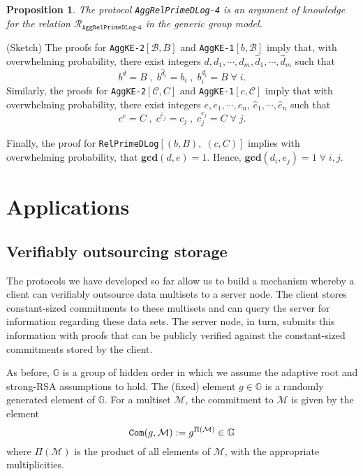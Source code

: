 \documentclass[11pt, lettersize, notitlepage, leqno, footskip=0.6cm]{article}
\newcommand{\ttt}{\texttt}
\newcommand{\mc}{\mathcal}
\newcommand{\mb}{\mathbb}
\newcommand{\mbf}{\mathbf}
\newcommand{\what}{\widehat}
\newcommand{\vs}{\vspace{-0.15cm}}
\newcommand{\op}{overwhelming probability}
\newcommand{\GCD}{\mbf{gcd}}
\newtheorem{Prop}[Thm]{Proposition}
\numberwithin{equation}{section}
\begin{document}
\begin{Prop} The protocol \verb|AggRelPrimeDLog-4| is an argument of knowledge for the relation $\mc{R}_{\ttt{AggRelPrimeDLog-4}}$ in the generic group model.\end{Prop}

\begin{prf} (Sketch) The proofs for \verb|AggKE-2|$[\mc{B}, B]$ and \verb|AggKE-1|$[b,\mc{B}]$ imply that, with overwhelming probability, there exist integers $d,d_1,\cdots,d_m,\what{d}_1,\cdots,\what{d}_m$ such that \vs $$b^d = B\;,\; b^{\what{d}_i}= b_i\;,\; b_i^{d_i}= B\;\forall\; i.$$ Similarly, the proofs for \verb|AggKE-2|$[\mc{C}, C]$ and \verb|AggKE-1|$[c,\mc{C}]$ imply that with overwhelming probability, there exist integers $e,e_1,\cdots,e_n$, $\what{e}_1,\cdots,\what{e}_n$ such that \vs $$c^e = C\;,\; c^{\what{e}_j}= c_j\;,\;c_j^{e_j}= C\;\forall\; j.$$ 

Finally, the proof for \verb|RelPrimeDLog|$[(b,B),\;(c,C)]$ implies with \op, that $\GCD(d,e) = 1$. Hence, $\GCD(d_i,e_j) = 1\;\forall\;i,j$.

\end{prf}

\bigskip

\section{\fontsize{12}{12} Applications}

\subsection{\fontsize{11}{11} Verifiably outsourcing storage}

The protocols we have developed so far allow us to build a mechanism whereby a client can verifiably outsource data multisets to a server node. The client stores constant-sized commitments to these multisets and can query the server for information regarding these data sets. The server node, in turn, submits this information with proofs that can  be publicly verified against the constant-sized commitments stored by the client.

As before, $\mb{G}$ is a group of hidden order in which we assume the adaptive root and strong-RSA assumptions to hold. The (fixed) element $g\in\mb{G}$ is a randomly generated element of $\mb{G}$. For a multiset $\mc{M}$, the commitment to $\mc{M}$ is given by the element \vs $$\protect{\verb|Com|}(g, \mc{M}):= g^{\Pi(\mc{M})}\in\mb{G}$$ where $\Pi(\mc{M})$ is the product of all elements of $\mc{M}$, with the appropriate multiplicities. \vspace{0.1cm}
\end{document}
